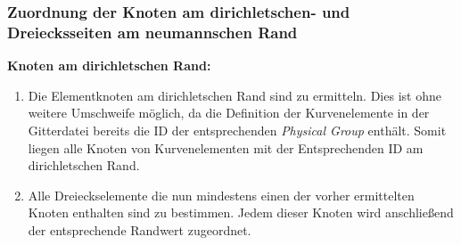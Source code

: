 \subsubsection{Zuordnung der Knoten am dirichletschen- und Dreiecksseiten am neumannschen Rand}
\label{sec:rb_assignment}
\textbf{Knoten am dirichletschen Rand:}
\begin{enumerate}
	\item Die Elementknoten am dirichletschen Rand sind zu ermitteln. Dies ist ohne weitere Umschweife möglich, da die Definition der Kurvenelemente in der Gitterdatei bereits die ID der entsprechenden \textit{Physical Group} enthält. Somit liegen alle Knoten von Kurvenelementen mit der Entsprechenden ID am dirichletschen Rand.
	
	\item Alle Dreieckselemente die nun mindestens einen der vorher ermittelten Knoten enthalten sind zu bestimmen. Jedem dieser Knoten wird anschließend der entsprechende Randwert zugeordnet.
\end{enumerate}

